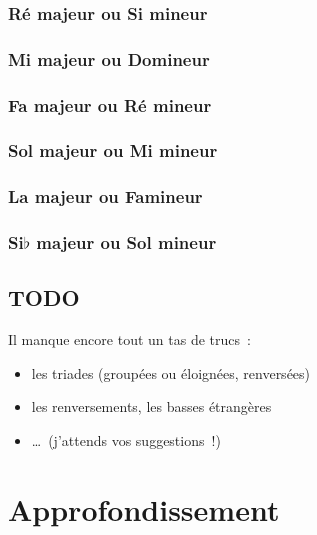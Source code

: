 \documentclass[11pt]{article}
\begin{document}
\subsubsection{Ré majeur ou Si mineur}


\subsubsection{Mi majeur ou Do\shrp mineur}


\subsubsection{Fa majeur ou Ré mineur}


\subsubsection{Sol majeur ou Mi mineur}


\subsubsection{La majeur ou Fa\shrp mineur}


\subsubsection{Si$\flat$ majeur ou Sol mineur}


\subsection{TODO}


Il manque encore tout un tas de trucs~:

\begin{itemize}
\item les triades (groupées ou éloignées, renversées)
\item les renversements, les basses étrangères
\item \ldots~(j’attends vos suggestions~!)
\end{itemize}

\section{Approfondissement} \label{approf}
\end{document}
